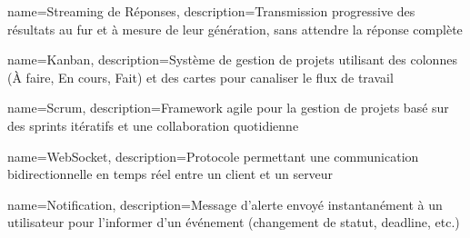 
 {
 name=Streaming de Réponses,
 description={Transmission progressive des résultats au fur et à mesure de leur génération, sans attendre la réponse complète}
 }

 {
 name=Kanban,
 description={Système de gestion de projets utilisant des colonnes (À faire, En cours, Fait) et des cartes pour canaliser le flux de travail}
 }

 {
 name=Scrum,
 description={Framework agile pour la gestion de projets basé sur des sprints itératifs et une collaboration quotidienne}
 }

 {
 name=WebSocket,
 description={Protocole permettant une communication bidirectionnelle en temps réel entre un client et un serveur}
 }

 {
 name=Notification,
 description={Message d'alerte envoyé instantanément à un utilisateur pour l'informer d'un événement (changement de statut, deadline, etc.)}
 }
 